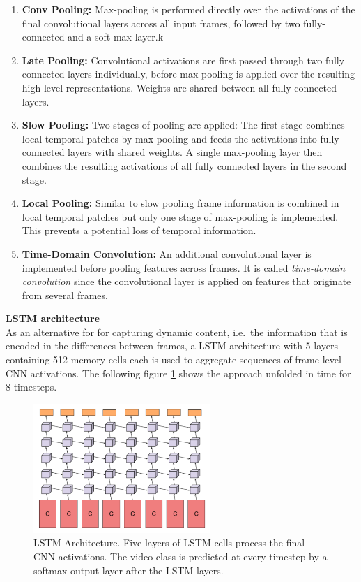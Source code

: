\begin{enumerate}[label=\alph*)]
\item \textbf{Conv Pooling:} Max-pooling is performed directly over the activations of the final convolutional layers across all input frames, followed by two fully-connected and a soft-max layer.k
\item \textbf{Late Pooling:} Convolutional activations are first passed through two fully connected layers individually, before max-pooling is applied over the resulting high-level representations. Weights are shared between all fully-connected layers.
\item \textbf{Slow Pooling:} Two stages of pooling are applied: The first stage combines local temporal patches by max-pooling and feeds the activations into fully connected layers with shared weights. A single max-pooling layer then combines the resulting activations of all fully connected layers in the second stage.
\item \textbf{Local Pooling:} Similar to slow pooling frame information is combined in local temporal patches but only one stage of max-pooling is implemented. This prevents a potential loss of temporal information.
\item \textbf{Time-Domain Convolution:} An additional convolutional layer is implemented before pooling features across frames. It is called \textit{time-domain convolution} since the convolutional layer is applied on features that originate from several frames.
\end{enumerate}

\textbf{LSTM architecture}\\
As an alternative for for capturing dynamic content, i.e.\ the information that is encoded in the differences between frames, a LSTM architecture \cite{hochreiter_long_1997} with 5 layers containing 512 memory cells each is used to aggregate sequences of frame-level CNN activations.
The following figure \ref{fig:beyondshort_lstmarchitecture} shows the approach unfolded in time for 8 timesteps.

\begin{figure}[H]
    \centering
    \includegraphics[width=0.6\textwidth]{img_deep/beyondshort_lstmarchitecture}
    \caption{LSTM Architecture. Five layers of LSTM cells process the final CNN activations. The video class is predicted at every timestep by a softmax output layer after the LSTM layers. \cite{ng_beyond_2015}}
    \label{fig:beyondshort_lstmarchitecture}
\end{figure}

